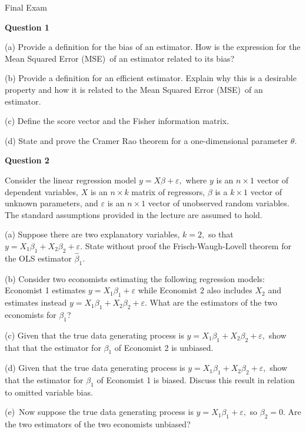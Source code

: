 \documentclass{article}
\begin{document}
\begin{center}
{\Large Final Exam}

\bigskip 
\end{center}

\textbf{Question 1}

(a) Provide a definition for the bias of an estimator. How is the expression
for the Mean Squared Error (MSE)\ of an estimator related to its bias?

(b) Provide a definition for an efficient estimator. Explain why this is a
desirable property and how it is related to the Mean Squared Error (MSE)\ of
an estimator.

(c) Define the score vector and the Fisher information matrix.

(d) State and prove the Cramer Rao theorem for a one-dimensional parameter $%
\theta $.

\bigskip 

\textbf{Question 2}

Consider the linear regression model $y=X\beta +\varepsilon ,$ where $y$ is
an $n\times 1$ vector of dependent variables, $X$ is an $n\times k$ matrix
of regressors, $\beta $ is a $k\times 1$ vector of unknown parameters, and $%
\varepsilon $ is an $n\times 1$ vector of unobserved random variables. The
standard assumptions provided in the lecture are assumed to hold.

(a) Suppose there are two explanatory variables, $k=2,$ so that $%
y=X_{1}\beta _{1}+X_{2}\beta _{2}+\varepsilon .$ State without proof the
Frisch-Waugh-Lovell theorem for the OLS estimator $\hat{\beta}_{1}.$

(b) Consider two economists estimating the following regression models:
Economist 1 estimates $y=X_{1}\beta _{1}+\varepsilon $ while Economist 2
also includes $X_{2}$ and estimates instead $y=X_{1}\beta _{1}+X_{2}\beta
_{2}+\varepsilon .$ What are the estimators of the two economists for $\beta
_{1}$?

(c) Given that the true data generating process is $y=X_{1}\beta
_{1}+X_{2}\beta _{2}+\varepsilon ,$ show that that the estimator for $\beta
_{1}$ of Economist 2 is unbiased.

(d) Given that the true data generating process is $y=X_{1}\beta
_{1}+X_{2}\beta _{2}+\varepsilon ,$ show that the estimator for $\beta _{1}$
of Economist 1 is biased. Discuss this result in relation to omitted
variable bias.

(e)\ Now suppose the true data generating process is $y=X_{1}\beta
_{1}+\varepsilon ,$ so $\beta _{2}=0.$ Are the two estimators of the two
economists unbiased?
\end{document}
